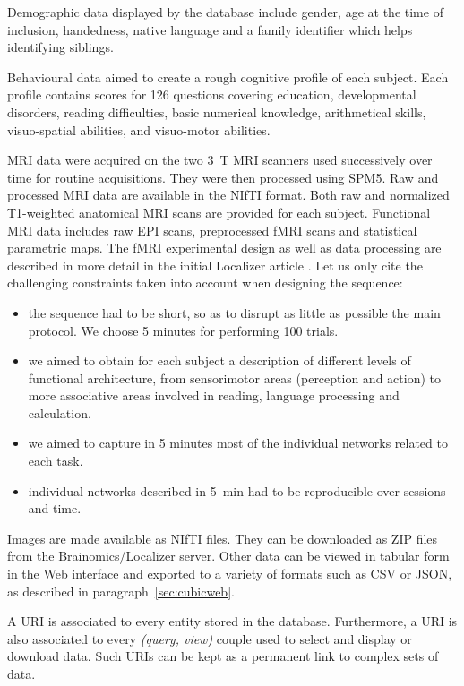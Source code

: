 \documentclass[review]{elsarticle}
\begin{document}
Demographic data displayed by the database include gender, age at the time of inclusion, handedness, native language and a family identifier which helps identifying siblings.

Behavioural data aimed to create a rough cognitive profile of each subject. Each profile contains scores for 126 questions covering education, developmental disorders, reading difficulties, basic numerical knowledge, arithmetical skills, visuo-spatial abilities, and visuo-motor abilities.

MRI data were acquired on the two 3~T MRI scanners used successively over time for routine acquisitions. They were then processed using SPM5. Raw and processed MRI data are available in the NIfTI format. Both raw and normalized T1-weighted anatomical MRI scans are provided for each subject. Functional MRI data includes raw EPI scans, preprocessed fMRI scans and statistical parametric maps. The fMRI experimental design as well as data processing are described in more detail in the initial Localizer article \cite{Pinel2007}. Let us only cite the challenging constraints taken into account when designing the sequence:
\begin{itemize}
\item the sequence had to be short, so as to disrupt as little as possible the main protocol. We choose 5 minutes for performing 100 trials.
\item we aimed to obtain for each subject a description of different levels of functional architecture, from sensorimotor areas (perception and action) to more associative areas involved in reading, language processing and calculation.
\item we aimed to capture in 5 minutes most of the individual networks related to each task.
\item individual networks described in 5~min had to be reproducible over sessions and time.
\end{itemize}

Images are made available as NIfTI files. They can be downloaded as ZIP files from the Brainomics/Localizer server. Other data can be viewed in tabular form in the Web interface and exported to a variety of formats such as CSV or JSON, as described in paragraph~\ref{sec:cubicweb}.

A URI is associated to every entity stored in the database. Furthermore, a URI is also associated to every \emph{(query, view)} couple used to select and display or download data. Such URIs can be kept as a permanent link to complex sets of data.
\end{document}
